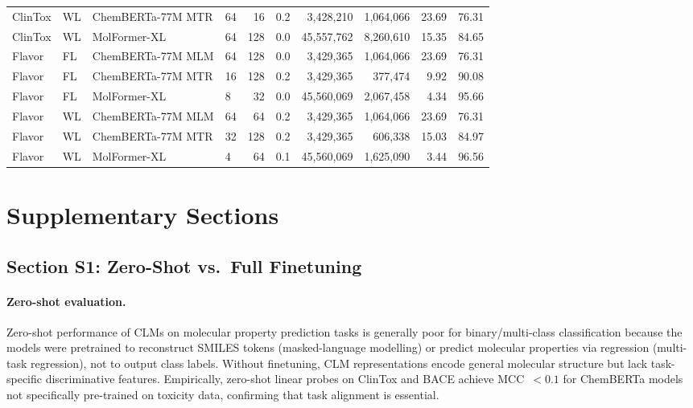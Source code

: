 \documentclass[9pt,a4paper]{article}
\begin{document}
\begin{table}[h]
{\begin{tabular}{llllrrrrrr}
ClinTox & WL & ChemBERTa-77M MTR & 64 & 16  & 0.2 & 3{,}428{,}210 & 1{,}064{,}066 & 23.69 & 76.31 \\
ClinTox & WL & MolFormer-XL       & 64 & 128 & 0.0 & 45{,}557{,}762 & 8{,}260{,}610 & 15.35 & 84.65 \\
\midrule
Flavor & FL & ChemBERTa-77M MLM & 64 & 128 & 0.0 & 3{,}429{,}365 & 1{,}064{,}066 & 23.69 & 76.31 \\
Flavor & FL & ChemBERTa-77M MTR & 16 & 128 & 0.2 & 3{,}429{,}365 & 377{,}474 & 9.92 & 90.08 \\
Flavor & FL & MolFormer-XL       & 8  & 32  & 0.0 & 45{,}560{,}069 & 2{,}067{,}458 & 4.34 & 95.66 \\
Flavor & WL & ChemBERTa-77M MLM & 64 & 64  & 0.2 & 3{,}429{,}365 & 1{,}064{,}066 & 23.69 & 76.31 \\
Flavor & WL & ChemBERTa-77M MTR & 32 & 128 & 0.2 & 3{,}429{,}365 & 606{,}338 & 15.03 & 84.97 \\
Flavor & WL & MolFormer-XL       & 4  & 64  & 0.1 & 45{,}560{,}069 & 1{,}625{,}090 & 3.44 & 96.56 \\
\bottomrule
\end{tabular}%
}
\end{table}

\newpage

\section*{Supplementary Sections}

\subsection*{Section S1: Zero-Shot vs.\ Full Finetuning}

\paragraph{Zero-shot evaluation.}
Zero-shot performance of CLMs on molecular property prediction tasks is generally
poor for binary/multi-class classification because the models were pretrained to reconstruct SMILES tokens (masked-language modelling) or predict molecular properties via regression (multi-task regression), not to output class labels. Without finetuning, CLM representations encode general molecular structure but lack task-specific discriminative features.
Empirically, zero-shot linear probes on ClinTox and BACE achieve MCC~$< 0.1$ for
ChemBERTa models not specifically pre-trained on toxicity data, confirming that task alignment is essential.
\end{document}
